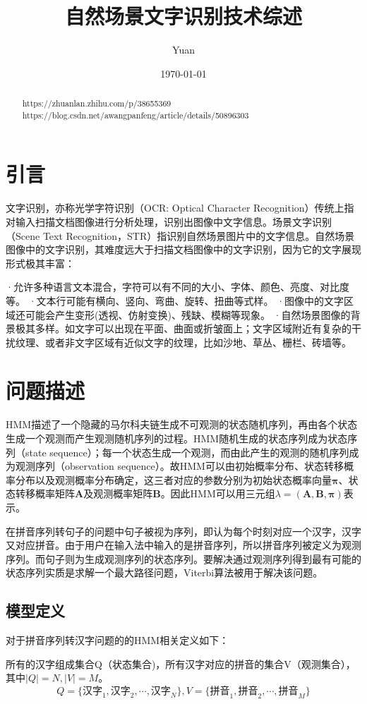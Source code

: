\documentclass[12pt,a4paper]{ctexart}
\title{自然场景文字识别技术综述}
\author{Yuan}
\date{\small\today}
\begin{document}
\maketitle
\begin{abstract}
https://zhuanlan.zhihu.com/p/38655369
https://blog.csdn.net/awangpanfeng/article/details/50896303
\end{abstract}	
\section{引言}
文字识别，亦称光学字符识别（OCR: Optical Character Recognition）传统上指对输入扫描文档图像进行分析处理，识别出图像中文字信息。场景文字识别（Scene Text Recognition，STR）指识别自然场景图片中的文字信息。自然场景图像中的文字识别，其难度远大于扫描文档图像中的文字识别，因为它的文字展现形式极其丰富：

·允许多种语言文本混合，字符可以有不同的大小、字体、颜色、亮度、对比度等。
·文本行可能有横向、竖向、弯曲、旋转、扭曲等式样。
·图像中的文字区域还可能会产生变形(透视、仿射变换)、残缺、模糊等现象。
·自然场景图像的背景极其多样。如文字可以出现在平面、曲面或折皱面上；文字区域附近有复杂的干扰纹理、或者非文字区域有近似文字的纹理，比如沙地、草丛、栅栏、砖墙等。
\section{问题描述}
HMM描述了一个隐藏的马尔科夫链生成不可观测的状态随机序列，再由各个状态生成一个观测而产生观测随机序列的过程。HMM随机生成的状态序列成为状态序列（state sequence）；每一个状态生成一个观测，而由此产生的观测的随机序列成为观测序列（observation sequence）。故HMM可以由初始概率分布、状态转移概率分布以及观测概率分布确定，这三者对应的参数分别为初始状态概率向量$ \bm{\pi} $、状态转移概率矩阵$\bm{A}$及观测概率矩阵$\bm{B}$。因此HMM可以用三元组$ \lambda=(\bm{A},\bm{B},\bm{\pi}) $表示\cite{李航统计学习}。

在拼音序列转句子的问题中句子被视为序列，即认为每个时刻对应一个汉字，汉字又对应拼音。由于用户在输入法中输入的是拼音序列，所以拼音序列被定义为观测序列。而句子则为生成观测序列的状态序列。要解决通过观测序列得到最有可能的状态序列实质是求解一个最大路径问题，Viterbi算法\cite{viterbi2006a}被用于解决该问题。
\subsection{模型定义}
对于拼音序列转汉字问题的的HMM相关定义如下：


所有的汉字组成集合Q（状态集合)，所有汉字对应的拼音的集合V（观测集合），其中$ |Q|=N, |V|=M $。
\[ Q=\{ \mbox{汉字}_1,\mbox{汉字}_2,\cdots,\mbox{汉字}_N \},V=\{ \mbox{拼音}_1,\mbox{拼音}_2,\cdots,\mbox{拼音}_M \}  \]
\end{document}

